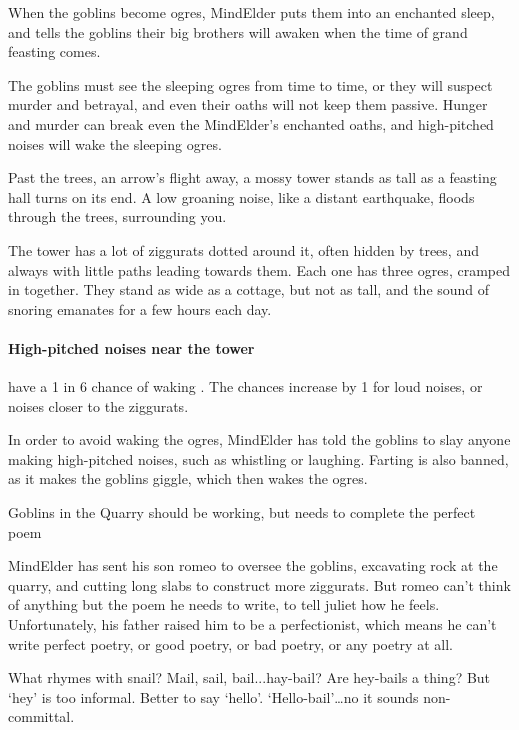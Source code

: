 \begin{multicols}{2}
When the goblins become \glspl{ogre}, \gls{MindElder} puts them into an enchanted sleep, and tells the goblins their big brothers will awaken when the time of grand feasting comes.

The goblins must see the sleeping \glspl{ogre} from time to time, or they will suspect murder and betrayal, and even their oaths will not keep them passive.
Hunger and murder can break even the \gls{MindElder}'s enchanted oaths, and high-pitched noises will wake the sleeping \glspl{ogre}.

\begin{boxtext}
  Past the trees, an arrow's flight away, a mossy tower stands as tall as a feasting hall turns on its end.
  A low groaning noise, like a distant earthquake, floods through the trees, surrounding you.
\end{boxtext}

The tower has a lot of ziggurats dotted around it, often hidden by trees, and always with little paths leading towards them.
Each one has three ogres, cramped in together.
They stand as wide as a cottage, but not as tall, and the sound of snoring emanates for a few hours each day.

\paragraph{High-pitched noises near the tower}
have a 1 in 6 chance of waking .
The chances increase by 1 for loud noises, or noises closer to the ziggurats.

In order to avoid waking the ogres, \gls{MindElder} has told the goblins to slay anyone making high-pitched noises, such as whistling or laughing.
Farting is also banned, as it makes the goblins giggle, which then wakes the ogres.

{Goblins in the Quarry}%
{ should be working, but needs to complete the perfect poem}%


\Gls{MindElder} has sent his son \gls{romeo} to oversee the goblins, excavating rock at the quarry, and cutting long slabs to construct more ziggurats.
But \gls{romeo} can't think of anything but the poem he needs to write, to tell \gls{juliet} how he feels.
Unfortunately, his father raised him to be a perfectionist, which means he can't write perfect poetry, or good poetry, or bad poetry, or any poetry at all.

\begin{speechtext}
  What rhymes with snail?
  Mail, sail, bail...hay-bail?
  Are hey-bails a thing?
  But `hey' is too informal.
  Better to say `hello'.
  `Hello-bail'\ldots no it sounds non-committal.
\end{speechtext}


\end{multicols}
